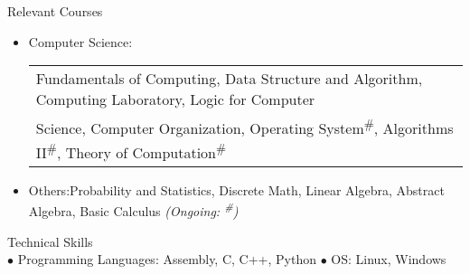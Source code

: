 \documentclass{article}
\begin{document}
{\Large Relevant Courses}
\vspace{-0.1cm}
\renewcommand{\labelitemi}{$\bullet$}
\begin{itemize}[leftmargin=0.8cm]
\setlength\itemsep{0.2pt}
\item Computer Science: \begin{tabular}{l}
	Fundamentals of Computing, Data Structure and Algorithm, Computing Laboratory, Logic for Computer \\Science, Computer Organization, Operating System\textsuperscript{\#}, Algorithms II\textsuperscript{\#}, Theory of Computation\textsuperscript{\#} 
\end{tabular}
\item Others:\hspace{1.98cm}Probability and Statistics, Discrete Math, Linear Algebra, Abstract Algebra, Basic Calculus \small{\emph{(Ongoing: \textsuperscript{\#})}}
\end{itemize}
{\Large Technical Skills}\\

$\bullet$ Programming Languages: Assembly, C, C++, Python \hspace{3cm} $\bullet$ OS: Linux, Windows \\
\end{document}
